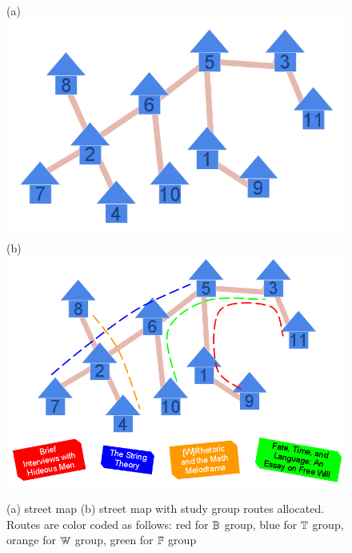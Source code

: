 \documentclass[MS,synopsis]{iitmdiss}
\begin{document}
\begin{figure}[htbp] %
 \centering
  (a) \includegraphics[scale=0.2]{../img/1_infinite_loop.png}
  (b) \includegraphics[scale=0.2]{../img/2_infinite_loop_BTWF.png}
 \label{fig:streetmap}
  \caption{\figtabsize (a) {\residenceblock} street map (b) {\residenceblock} street map with study group routes
    allocated. Routes are color coded as follows: red for
    \textcolor{red}{$\mathbb{B}$} group, blue for \textcolor{blue}{$\mathbb{T}$}
    group, orange for \textcolor{YellowOrange}{$\mathbb{W}$} group, green for
    \textcolor{green}{$\mathbb{F}$} group}
\end{figure}
\end{document}

